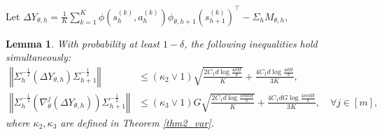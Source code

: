 \documentclass{article}
\newtheorem{lemma}{Lemma}[section]
\numberwithin{equation}{section}
\begin{document}
Let $\Delta Y_{\theta,h}=\frac{1}{K}\sum_{k=1}^K\phi\left(s_h^{(k)},a_h^{(k)}\right)\phi_{\theta,h+1}\left(s_{h+1}^{(k)}\right)^\top-\Sigma_h M_{\theta,h}$, 
\begin{lemma}
\label{dy}
With probability at least $1-\delta$, the following inequalities hold simultaneously:
\begin{align}
\label{3_1}
\left\Vert\Sigma_h^{-\frac{1}{2}}\left(\Delta Y_{\theta,h}\right)\Sigma_{h+1}^{-\frac{1}{2}}\right\Vert&\leq\left(\kappa_2\vee 1\right)\sqrt{\frac{2C_1d\log\frac{4dH}{\delta}}{K}} + \frac{4C_1d\log\frac{4dH}{\delta}}{3K},\\
\label{3_2}
\left\Vert\Sigma_h^{-\frac{1}{2}}\left(\nabla_\theta^j\left(\Delta Y_{\theta,h}\right)\right)\Sigma_{h+1}^{-\frac{1}{2}}\right\Vert&\leq\left(\kappa_3\vee 1\right)G\sqrt{\frac{2C_1d\log\frac{4mdH}{\delta}}{K}}+\frac{4C_1dG\log\frac{4mdH}{\delta}}{3K},\quad\forall j\in[m],
\end{align}
where $\kappa_2, \kappa_3$ are defined in Theorem \ref{thm2_var}. 
\end{lemma}
\end{document}

